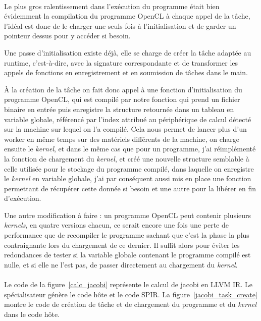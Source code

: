\paragraph{}
Le plus gros ralentissement dans l'exécution du programme était bien évidemment
la compilation du programme OpenCL à chaque appel de la tâche, l'idéal est donc
de le charger une seuls fois à l'initialisation et de garder un pointeur dessus
pour y accéder si besoin.

Une passe d'initialisation existe déjà, elle se charge de créer la tâche adaptée
au runtime, c'est-à-dire, avec la signature correspondante et de transformer les
appels de fonctions en enregistrement et en soumission de tâches dans le main.

À la création de la tâche on fait donc appel à une fonction d'initialisation du
programme OpenCL, qui est compilé par notre fonction qui prend un fichier
binaire en entrée puis enregistre la structure retournée dans un tableau en
variable globale, référencé par l'index attribué au périphérique de calcul
détecté sur la machine sur lequel on l'a compilé. Cela nous permet de lancer
plus d'un worker en même temps sur des matériels différents de la machine, on
charge ensuite le \emph{kernel}, et dans le même cas que pour un programme, j'ai
réimplémenté la fonction de chargement du \emph{kernel}, et créé une nouvelle
structure semblable à celle utilisée pour le stockage du programme compilé, dans
laquelle on enregistre le \emph{kernel} en variable globale, j'ai par conséquent
aussi mis en place une fonction permettant de récupérer cette donnée si besoin
et une autre pour la libérer en fin d'exécution.

Une autre modification à faire : un programme OpenCL peut contenir plusieurs
\emph{kernels}, en quatre versions chacun, ce serait encore une fois une perte
de performance que de recompiler le programme sachant que c'est la phase la plus
contraignante lors du chargement de ce dernier. Il suffit alors pour éviter les
redondances de tester si la variable globale contenant le programme compilé est
nulle, et si elle ne l'est pas, de passer directement au chargement du
\emph{kernel}.

\paragraph{}
Le code de la figure~\ref{calc_jacobi} représente le calcul de jacobi en LLVM
IR. Le spécialisateur génère le code hôte et le code SPIR. La
figure~\ref{jacobi_task_create} montre le code de création de tâche et de
chargement du programme et du \emph{kernel} dans le code hôte.

